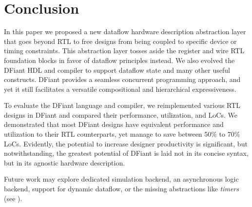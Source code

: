 \section{Conclusion}
\label{sec:conclusion}
In this paper we proposed a new dataflow hardware description abstraction layer that goes beyond RTL to free designs from being coupled to specific device or timing constraints. This abstraction layer tosses aside the register and wire RTL foundation blocks in favor of dataflow principles instead. We also evolved the DFiant HDL and compiler to support dataflow state and many other useful constructs. DFiant provides a seamless concurrent programming approach, and yet it still facilitates a versatile compositional and hierarchical expressiveness. 

To evaluate the DFiant language and compiler, we reimplemented various RTL designs in DFiant and compared their performance, utilization, and LoCs. We demonstrated that most DFiant designs have equivalent performance and utilization to their RTL counterparts, yet manage to save between 50\% to 70\% LoCs. Evidently, the potential to increase designer productivity is significant, but notwithstanding, the greatest potential of DFiant is laid not in its concise syntax, but in its agnostic hardware description.  


Future work may explore dedicated simulation backend, an asynchronous logic backend, support for dynamic dataflow, or the missing abstractions like \emph{timers} (see ).
